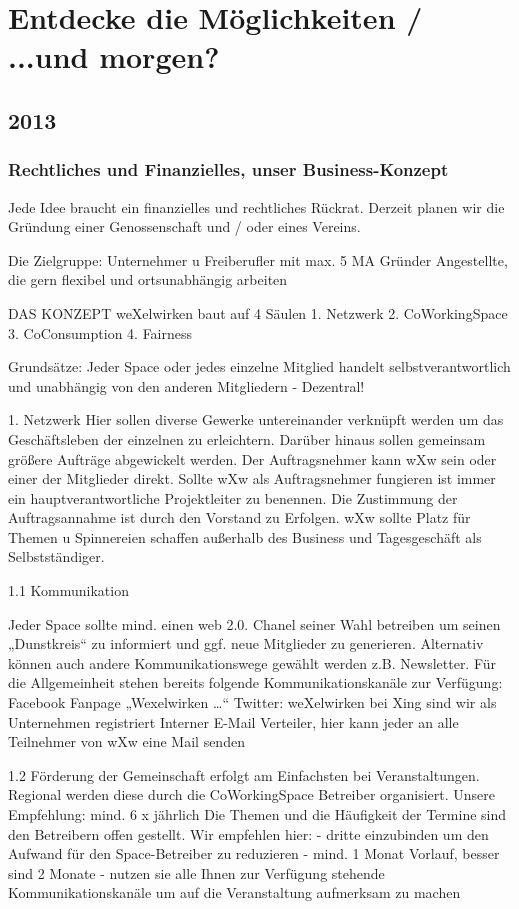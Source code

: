 \chapter{Entdecke die Möglichkeiten / ...und morgen?}

  \section{2013}
\subsection{Rechtliches und Finanzielles, unser Business-Konzept}

Jede Idee braucht ein finanzielles und rechtliches Rückrat. 
Derzeit planen wir die Gründung einer Genossenschaft und / oder eines Vereins.

Die Zielgruppe:
Unternehmer u Freiberufler mit max. 5 MA
Gründer
Angestellte, die gern flexibel und ortsunabhängig arbeiten 


DAS KONZEPT
weXelwirken baut auf 4 Säulen
1. Netzwerk
2. CoWorkingSpace
3. CoConsumption 
4. Fairness 

Grundsätze:
Jeder Space oder jedes einzelne Mitglied handelt selbstverantwortlich und unabhängig von den anderen Mitgliedern - Dezentral!



1. Netzwerk
Hier sollen diverse Gewerke untereinander verknüpft werden um das Geschäftsleben der einzelnen zu erleichtern. Darüber hinaus sollen gemeinsam größere Aufträge abgewickelt werden. Der Auftragsnehmer kann wXw sein oder einer der Mitglieder direkt.
Sollte wXw als Auftragsnehmer fungieren ist immer ein hauptverantwortliche Projektleiter zu benennen. Die Zustimmung der Auftragsannahme ist durch den Vorstand zu Erfolgen.
wXw sollte Platz für Themen u Spinnereien schaffen außerhalb des Business und Tagesgeschäft als Selbstständiger.

1.1 Kommunikation 

Jeder Space sollte mind. einen web 2.0. Chanel seiner Wahl betreiben um seinen „Dunstkreis“ zu informiert und ggf. neue Mitglieder zu generieren. Alternativ können auch andere Kommunikationswege gewählt werden z.B. Newsletter.
Für die Allgemeinheit stehen bereits folgende Kommunikationskanäle zur Verfügung:
Facebook Fanpage „Wexelwirken …“
Twitter: weXelwirken
bei Xing sind wir als Unternehmen registriert
Interner E-Mail Verteiler, hier kann jeder an alle Teilnehmer von wXw eine Mail senden 


1.2 Förderung der Gemeinschaft
erfolgt am Einfachsten bei Veranstaltungen. 
Regional werden diese durch die CoWorkingSpace Betreiber organisiert. Unsere Empfehlung: mind. 6 x jährlich 
Die Themen und die Häufigkeit der Termine sind den Betreibern offen gestellt. Wir empfehlen hier:
- dritte einzubinden um den Aufwand für den Space-Betreiber zu reduzieren
- mind. 1 Monat Vorlauf, besser sind 2 Monate
- nutzen sie alle Ihnen zur Verfügung stehende Kommunikationskanäle um auf die Veranstaltung aufmerksam zu machen


